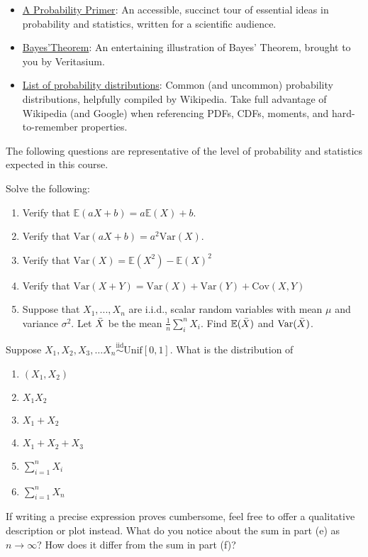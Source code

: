 \documentclass{harvardml}
\theoremstyle{definition}
\theoremstyle{plain}
\newcommand{\E}{\mathbb{E}}
\newcommand{\var}{\text{Var}}
\newcommand{\cov}{\text{Cov}}
\begin{document}
\begin{itemize}
	\item \href{https://healy.create.stedwards.edu/Chemistry/CHEM4341/BayesPrimer2.pdf}{A Probability Primer}:
	An accessible, succinct tour of essential ideas in probability and statistics,
	written for a scientific audience.
	\item \href{https://www.youtube.com/watch?v=R13BD8qKeTg}{Bayes'Theorem}:
	An entertaining illustration of Bayes' Theorem, brought to you by Veritasium.
	\item
	\href{https://en.wikipedia.org/wiki/List_of_probability_distributions}{List
	of probability distributions}: Common (and uncommon) probability
	distributions, helpfully compiled by Wikipedia. Take full advantage of
	Wikipedia (and Google) when referencing PDFs, CDFs, moments, and
	hard-to-remember properties.
\end{itemize}


The following questions are representative of the level of probability and
statistics expected in this course. \\

\begin{problem} Solve the following: 
\begin{enumerate} [label=(\alph*)] 
\item Verify that $\E(aX + b) = a \E(X) + b$.
\item Verify that $\var(aX + b) = a^2\var(X)$.
\item Verify that $\var(X) = \E(X^2) - \E(X)^2$
\item Verify that $\var(X + Y) = \var(X) + \var(Y) + \cov(X, Y)$

\item Suppose that $X_1, ..., X_n$ are i.i.d., scalar random variables with mean $\mu$ and variance $\sigma^2$. Let $\Bar{X}$ be the mean $\frac{1}{n}\sum_i^n X_i$. Find $\E(\Bar{X})$ and $\var(\Bar{X})$.
\end{enumerate}
\end{problem}

\begin{problem}
Suppose $X_1, X_2, X_3, \ldots X_n \overset{\text{iid}}{\sim} \text{Unif}[0, 1].$
What is the distribution of

\begin{enumerate} [label=(\alph*)] 
\item $(X_1, X_2)$
\item $X_1 X_2$
\item $X_1 + X_2$
\item $X_1 + X_2 + X_3$
\item $\sum_{i=1}^n X_i$
\item $\sum_{i=1}^n X_n$
\end{enumerate}

If writing a precise expression proves cumbersome, feel free to offer a qualitative description
or plot instead. What do you notice about the sum in part (e) as $n \rightarrow \infty$?
How does it differ from the sum in part (f)?
\end{problem}
\end{document}
